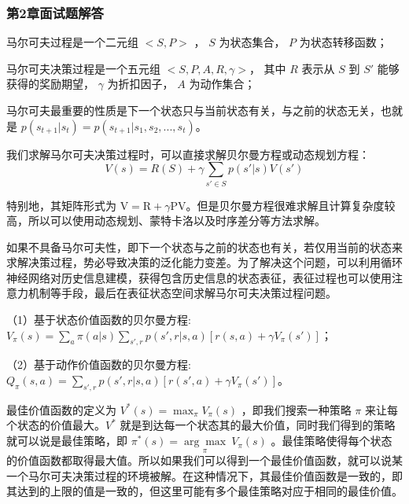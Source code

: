 \subsubsection*{第2章面试题解答}

  
马尔可夫过程是一个二元组 $ <S,P> $ ， $S$ 为状态集合， $P$ 为状态转移函数；
  
马尔可夫决策过程是一个五元组 $ <S,P,A,R,\gamma> $， 其中 $R$ 表示从 $S$ 到 $S'$ 能够获得的奖励期望， $\gamma$ 为折扣因子， $A$ 为动作集合；
  
马尔可夫最重要的性质是下一个状态只与当前状态有关，与之前的状态无关，也就是 $p(s_{t+1} | s_t)= p(s_{t+1}|s_1,s_2,...,s_t)$。

  
我们求解马尔可夫决策过程时，可以直接求解贝尔曼方程或动态规划方程：
\begin{equation}\nonumber
    \label{eq:}
    V(s)=R(S)+ \gamma \sum_{s' \in S}p(s'|s)V(s')
\end{equation}

特别地，其矩阵形式为 $\mathrm{V}=\mathrm{R}+\gamma \mathrm{PV}$。但是贝尔曼方程很难求解且计算复杂度较高，所以可以使用动态规划、蒙特卡洛以及时序差分等方法求解。

  
如果不具备马尔可夫性，即下一个状态与之前的状态也有关，若仅用当前的状态来求解决策过程，势必导致决策的泛化能力变差。为了解决这个问题，可以利用循环神经网络对历史信息建模，获得包含历史信息的状态表征，表征过程也可以使用注意力机制等手段，最后在表征状态空间求解马尔可夫决策过程问题。


（1）基于状态价值函数的贝尔曼方程: $V_{\pi}(s) = \sum_{a}{\pi(a|s)}\sum_{s',r}{p(s',r|s,a)[r(s,a)+\gamma V_{\pi}(s')]}$；

（2）基于动作价值函数的贝尔曼方程: $Q_{\pi}(s,a)=\sum_{s',r}p(s',r|s,a)[r(s',a)+\gamma V_{\pi}(s')]$。

  
最佳价值函数的定义为 $V^* (s)=\max_{\pi} V_{\pi}(s)$ ，即我们搜索一种策略 $\pi$ 来让每个状态的价值最大。$V^*$ 就是到达每一个状态其的最大价值，同时我们得到的策略就可以说是最佳策略，即 $ \pi^{*}(s)=\underset{\pi}{\arg \max }~ V_{\pi}(s) $ 。最佳策略使得每个状态的价值函数都取得最大值。所以如果我们可以得到一个最佳价值函数，就可以说某一个马尔可夫决策过程的环境被解。在这种情况下，其最佳价值函数是一致的，即其达到的上限的值是一致的，但这里可能有多个最佳策略对应于相同的最佳价值。

  
